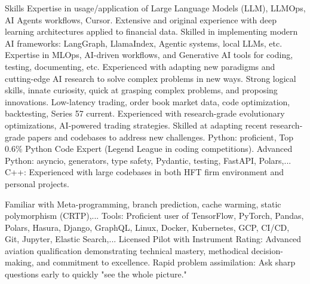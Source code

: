 \begin{rubric}{Skills}
\entry*[]%
Expertise in usage/application of Large Language Models (LLM), LLMOps, AI Agents workflows, Cursor.
\entry*[]%
Extensive and original experience with deep learning architectures applied to financial data.
\entry*[]%
Skilled in implementing modern AI frameworks: LangGraph, LlamaIndex, Agentic systems, local LLMs, etc.
\entry*[]%
Expertise in MLOps, AI-driven workflows, and Generative AI tools for coding, testing, documenting, etc.
\entry*[]%
Experienced with adapting new paradigms and cutting-edge AI research to solve complex problems in new ways.
%
\entry*[]%
Strong logical skills, innate curiosity, quick at grasping complex problems, and proposing innovations.
\entry*[]%
Low-latency trading, order book market data, code optimization, backtesting, Series 57 current.
\entry*[]%
Experienced with research-grade evolutionary optimizations, AI-powered trading strategies.
\entry*[]%
Skilled at adapting recent research-grade papers and codebases to address new challenges. 
%
%
\entry*[]%
Python:  proficient, Top 0.6\% Python Code Expert (Legend League in coding competitions).
\entry*[]%
Advanced Python: asyncio, generators, type safety, Pydantic, testing, FastAPI, Polars,...
\entry*[]%
C++: Experienced with large codebases in both HFT firm environment and personal projects. 

Familiar with Meta-programming, branch prediction, cache warming, static polymorphism (CRTP),...
\entry*[]%
Tools: Proficient user of TensorFlow, PyTorch, Pandas, Polars, Hasura, Django, GraphQL, Linux, Docker, Kubernetes, GCP, CI/CD, Git, Jupyter, Elastic Search,...
%
\entry*[]%
Licensed Pilot with Instrument Rating: Advanced aviation qualification demonstrating technical mastery, methodical decision-making, and commitment to excellence.
\entry*[]%
Rapid problem assimilation: Ask sharp questions early to quickly "see the whole picture."
%
\end{rubric}
